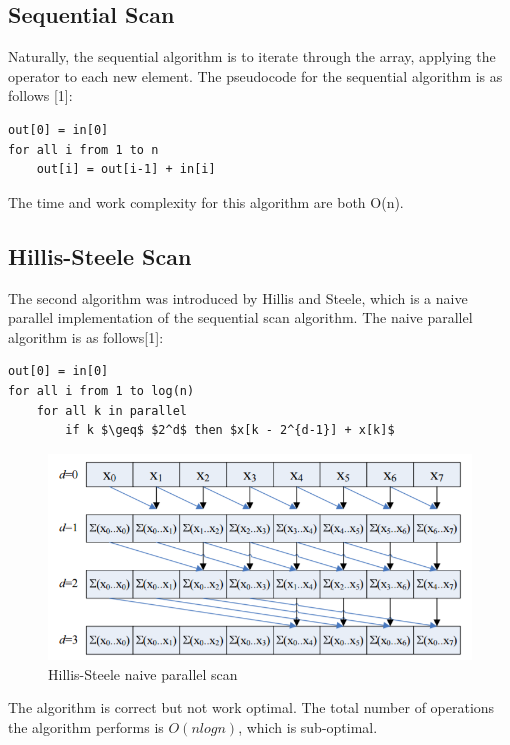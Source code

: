 \documentclass[twoside]{article}
\begin{document}
\subsection{Sequential Scan}
Naturally, the sequential algorithm is to iterate through the array, applying the operator to each new element. The pseudocode for the sequential algorithm is as follows [1]:

\begin{lstlisting}[caption=Sequential Scan]
out[0] = in[0]
for all i from 1 to n
    out[i] = out[i-1] + in[i]
\end{lstlisting}

The time and work complexity for this algorithm are both O(n).



\subsection{Hillis-Steele Scan}

The second algorithm was introduced by Hillis and Steele, which is a naive parallel implementation of the sequential scan algorithm. The naive parallel algorithm is as follows[1]:

\begin{lstlisting}[caption=Hillis-Steele Scan, mathescape]
out[0] = in[0]
for all i from 1 to log(n)
    for all k in parallel
        if k $\geq$ $2^d$ then $x[k - 2^{d-1}] + x[k]$
\end{lstlisting}

\begin{figure}[h]
    \centering
    \includegraphics{naive}
    \caption{Hillis-Steele naive parallel scan}
    \label{fig:hillis-steele}
\end{figure}
\break

The algorithm is correct but not work optimal. The total number of operations the algorithm performs is $O(nlogn)$, which is sub-optimal.
\end{document}
